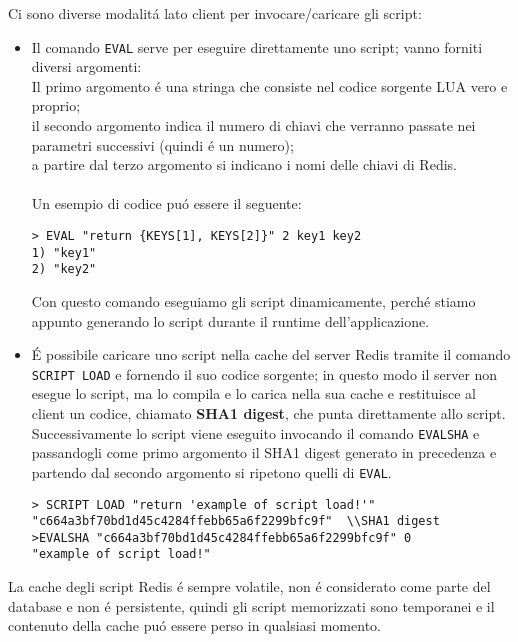 Ci sono diverse modalitá lato client per invocare/caricare gli script:
\begin{itemize}
    \item Il comando \texttt{EVAL} serve per eseguire direttamente uno script; vanno forniti diversi argomenti:\\
    Il primo argomento é una stringa che consiste nel codice sorgente LUA vero e proprio;\\
    il secondo argomento indica il numero di chiavi che verranno passate nei parametri successivi (quindi é un numero);\\
    a partire dal terzo argomento si indicano i nomi delle chiavi di Redis.\\
      \\


    Un esempio di codice puó essere il seguente:
    \begin{lstlisting}[autogobble]
> EVAL "return {KEYS[1], KEYS[2]}" 2 key1 key2
1) "key1"
2) "key2"\end{lstlisting}
    Con questo comando eseguiamo gli script dinamicamente, perché stiamo appunto generando lo script durante il runtime dell'applicazione.
    \item É possibile caricare uno script nella cache del server Redis tramite il comando \texttt{SCRIPT LOAD} e fornendo il suo codice
    sorgente; in questo modo il server non esegue lo script, ma lo compila e lo carica nella sua cache e restituisce al client un codice, chiamato
    \textbf{SHA1 digest}, che punta direttamente allo script. Successivamente lo script viene eseguito invocando il comando \texttt{EVALSHA} e passandogli come
    primo argomento il SHA1 digest generato in precedenza e partendo dal secondo argomento si ripetono quelli di \texttt{EVAL}.

    \begin{lstlisting}[autogobble]
> SCRIPT LOAD "return 'example of script load!'"
"c664a3bf70bd1d45c4284ffebb65a6f2299bfc9f"  \\SHA1 digest
>EVALSHA "c664a3bf70bd1d45c4284ffebb65a6f2299bfc9f" 0
"example of script load!"\end{lstlisting}
\end{itemize}

La cache degli script Redis é sempre volatile, non é considerato come parte del database e non é persistente, quindi gli script memorizzati
sono temporanei e il contenuto della cache puó essere perso in qualsiasi momento.